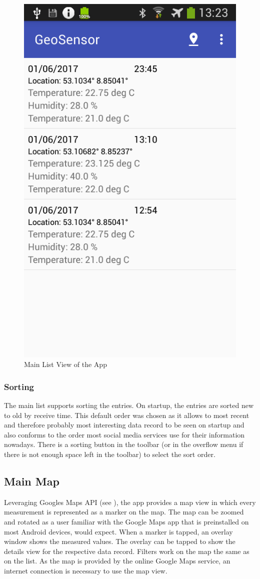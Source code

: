 \begin{figure}
\centering
\includegraphics[width=.4\linewidth]{src/main_activity.png}
\caption{Main List View of the App}
\label{fig:main_activity}
\end{figure}

\subsubsection{Sorting}
The main list supports sorting the entries. On startup, the entries are sorted new to old by receive time. This default order was chosen as it allows to most recent and therefore probably most interesting data record to be seen on startup and also conforms to the order most social media services use for their information nowadays. There is a sorting button in the toolbar (or in the overflow menu if there is not enough space left in the toolbar) to select the sort order.

\subsection{Main Map}
\label{subs:mainmap}
Leveraging Googles Maps API (see \cite{GMapsAPI}), the app provides a map view in which every measurement is represented as a marker on the map. The map can be zoomed and rotated as a user familiar with the Google Maps app that is preinstalled on most Android devices, would expect. When a marker is tapped, an overlay window shows the measured values. The overlay can be tapped to show the details view for the respective data record. Filters work on the map the same as on the list. As the map is provided by the online Google Maps service, an internet connection is necessary to use the map view.

